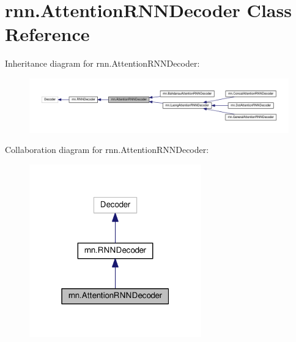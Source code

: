 \hypertarget{classrnn_1_1AttentionRNNDecoder}{}\section{rnn.\+Attention\+R\+N\+N\+Decoder Class Reference}
\label{classrnn_1_1AttentionRNNDecoder}


Inheritance diagram for rnn.\+Attention\+R\+N\+N\+Decoder\+:
\nopagebreak
\begin{figure}[H]
\begin{center}
\leavevmode
\includegraphics[width=350pt]{classrnn_1_1AttentionRNNDecoder__inherit__graph}
\end{center}
\end{figure}


Collaboration diagram for rnn.\+Attention\+R\+N\+N\+Decoder\+:
\nopagebreak
\begin{figure}[H]
\begin{center}
\leavevmode
\includegraphics[width=211pt]{classrnn_1_1AttentionRNNDecoder__coll__graph}
\end{center}
\end{figure}
